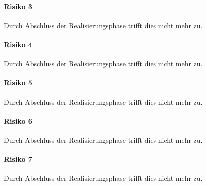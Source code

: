 \paragraph{Risiko 3}
Durch Abschluss der Realisierungsphase trifft dies nicht mehr zu.
\paragraph{Risiko 4}
Durch Abschluss der Realisierungsphase trifft dies nicht mehr zu.
\paragraph{Risiko 5}
Durch Abschluss der Realisierungsphase trifft dies nicht mehr zu.
\paragraph{Risiko 6}
Durch Abschluss der Realisierungsphase trifft dies nicht mehr zu.
\paragraph{Risiko 7}
Durch Abschluss der Realisierungsphase trifft dies nicht mehr zu.
